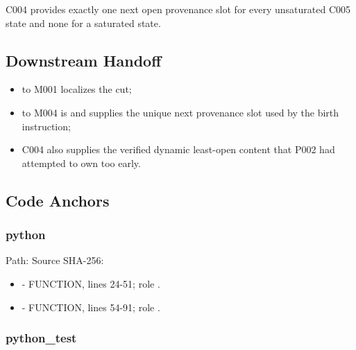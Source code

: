 C004 provides exactly one next open provenance slot for every
unsaturated C005 state and none for a saturated state.

\subsection{Downstream Handoff}\label{downstream-handoff-15}

\begin{itemize}
\tightlist
\item
  \texttt{\protect{}} to M001 localizes the cut;
\item
  \texttt{\protect{}} to M004 is \texttt{\protect{}} and supplies the
  unique next provenance slot used by the birth instruction;
\item
  C004 also supplies the verified dynamic least-open content that P002
  had attempted to own too early.
\end{itemize}

\subsection{Code Anchors}\label{code-anchors-11}

\subsubsection{python}\label{python-2}

Path:
Source SHA-256:
\texttt{\protect{}}

\begin{itemize}
\tightlist
\item
  \texttt{\protect{}} - FUNCTION, lines 24-51;
  role \texttt{\protect{}}.
\item
  \texttt{\protect{}} - FUNCTION, lines 54-91; role
  \texttt{\protect{}}.
\end{itemize}

\subsubsection{python\_test}\label{python_test-1}

